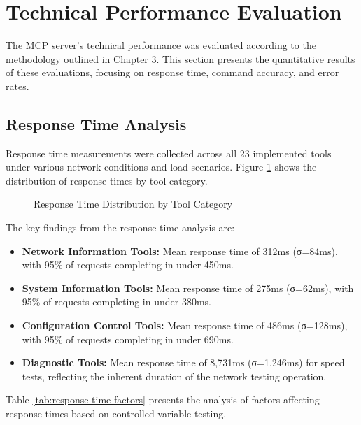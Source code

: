 \section{Technical Performance Evaluation}
The MCP server's technical performance was evaluated according to the methodology outlined in Chapter 3. This section presents the quantitative results of these evaluations, focusing on response time, command accuracy, and error rates.

\subsection{Response Time Analysis}
Response time measurements were collected across all 23 implemented tools under various network conditions and load scenarios. Figure \ref{fig:response-times} shows the distribution of response times by tool category.

\begin{figure}[h]
\centering
\caption{Response Time Distribution by Tool Category}
\label{fig:response-times}
\end{figure}

The key findings from the response time analysis are:

\begin{itemize}
\item \textbf{Network Information Tools:} Mean response time of 312ms (σ=84ms), with 95\% of requests completing in under 450ms.
\item \textbf{System Information Tools:} Mean response time of 275ms (σ=62ms), with 95\% of requests completing in under 380ms.
\item \textbf{Configuration Control Tools:} Mean response time of 486ms (σ=128ms), with 95\% of requests completing in under 690ms.
\item \textbf{Diagnostic Tools:} Mean response time of 8,731ms (σ=1,246ms) for speed tests, reflecting the inherent duration of the network testing operation.
\end{itemize}

Table \ref{tab:response-time-factors} presents the analysis of factors affecting response times based on controlled variable testing.

